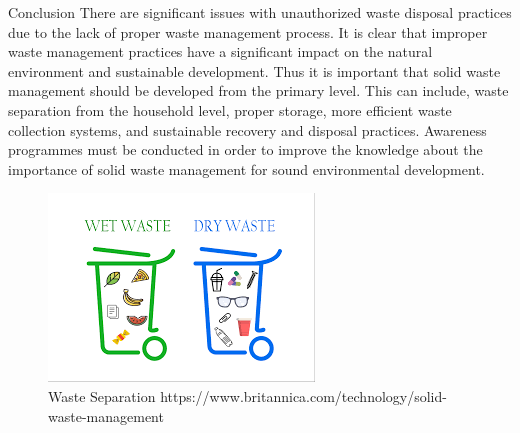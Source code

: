 \documentclass[final]{beamer}
\newlength{\onecolwid}
\begin{document}
\begin{frame}
\begin{columns}[t]
\begin{column}{\onecolwid}
\begin{exampleblock}{Conclusion}
There are significant issues with unauthorized waste disposal practices due to the lack of proper waste management process.
It is clear that improper waste management practices have a significant impact on the natural environment and sustainable development.
Thus it is important that solid waste management should be developed from the primary level. 
This can include, waste separation from the household level, proper storage, more efficient waste collection systems, and sustainable recovery and disposal practices.
Awareness programmes must be conducted in order to improve the knowledge about the importance of solid waste management for sound environmental development.
\begin{figure}
\includegraphics[width=1\linewidth]{img/conclude.png}
\caption{Waste Separation \smallskip https://www.britannica.com/technology/solid-waste-management}
\end{figure}
 
\end{exampleblock}





\end{column}
\end{columns}
\end{frame}
\end{document}
